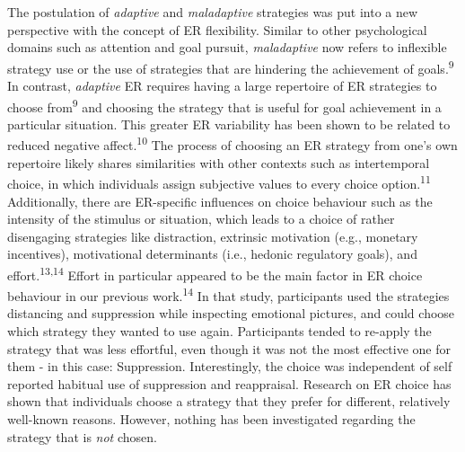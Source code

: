 \documentclass[
  english,
  man,floatsintext]{apa6}
\begin{document}
The postulation of \emph{adaptive} and \emph{maladaptive} strategies was put into a new perspective with the concept of ER flexibility.
Similar to other psychological domains such as attention and goal pursuit, \emph{maladaptive} now refers to inflexible strategy use or the use of strategies that are hindering the achievement of goals.\textsuperscript{9}
In contrast, \emph{adaptive} ER requires having a large repertoire of ER strategies to choose from\textsuperscript{9} and choosing the strategy that is useful for goal achievement in a particular situation.
This greater ER variability has been shown to be related to reduced negative affect.\textsuperscript{10}
The process of choosing an ER strategy from one's own repertoire likely shares similarities with other contexts such as intertemporal choice, in which individuals assign subjective values to every choice option.\textsuperscript{11}
Additionally, there are ER-specific influences on choice behaviour such as the intensity of the stimulus or situation, which leads to a choice of rather disengaging strategies like distraction, extrinsic motivation (e.g., monetary incentives), motivational determinants (i.e., hedonic regulatory goals), and effort.\textsuperscript{13,14}
Effort in particular appeared to be the main factor in ER choice behaviour in our previous work.\textsuperscript{14}
In that study, participants used the strategies distancing and suppression while inspecting emotional pictures, and could choose which strategy they wanted to use again.
Participants tended to re-apply the strategy that was less effortful, even though it was not the most effective one for them - in this case: Suppression.
Interestingly, the choice was independent of self reported habitual use of suppression and reappraisal.
Research on ER choice has shown that individuals choose a strategy that they prefer for different, relatively well-known reasons.
However, nothing has been investigated regarding the strategy that is \emph{not} chosen.
\end{document}
